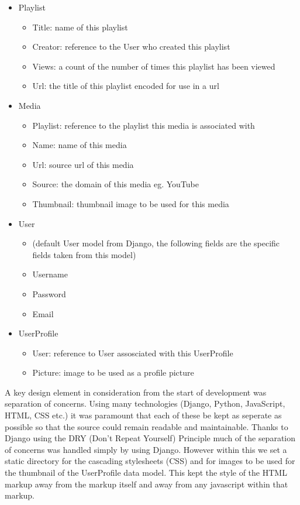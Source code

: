 \begin{itemize}
\item{Playlist}
  \begin{itemize}
  \item{Title: name of this playlist}
  \item{Creator: reference to the User who created this playlist}
  \item{Views: a count of the number of times this playlist has
      been viewed}
  \item{Url: the title of this playlist encoded for use in a url}
  \end{itemize}
\item{Media}
  \begin{itemize}
  \item{Playlist: reference to the playlist this media is associated
      with}
  \item{Name: name of this media}
  \item{Url: source url of this media}
  \item{Source: the domain of this media eg. YouTube}
  \item{Thumbnail: thumbnail image to be used for this media}
  \end{itemize}
\item{User}
  \begin{itemize}
  \item{(default User model from Django, the following fields are the
      specific fields taken from this model)}
  \item{Username}
  \item{Password}
  \item{Email}
  \end{itemize}
\item{UserProfile}
  \begin{itemize}
  \item{User: reference to User assosciated with this UserProfile}
  \item{Picture: image to be used as a profile picture}
  \end{itemize}
\end{itemize}

A key design element in consideration from the start of development
was separation of concerns.
Using many technologies (Django, Python, JavaScript, HTML, CSS etc.)
it was paramount that each of these be kept as seperate as possible so
that the source could remain readable and maintainable.
Thanks to Django using the DRY (Don't Repeat Yourself) Principle
\cite{dryPrinciple} much of the separation of concerns was handled
simply by using Django.
However within this we set a static directory for the cascading
stylesheets (CSS) and for images to be used for the thumbnail of the
UserProfile data model.
This kept the style of the HTML markup away from the markup itself and
away from any javascript within that markup.